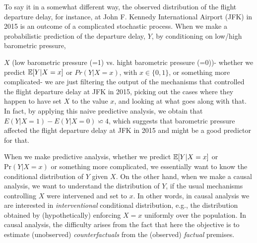 \begin{example}
{To say it in a somewhat different way, the observed distribution of
the flight departure delay, for instance,  at John F. Kennedy International Airport (JFK) in 2015 is an outcome of a complicated stochastic process. When we make
a probabilistic prediction of the departure delay, $Y$,  by
conditioning on low/high barometric pressure, $X$ (low barometric pressure (=1) vs. hight barometric pressure (=0))- whether we predict $\mathbb{E}[Y | X = x]$ or
$Pr(Y | X = x)$, with $x \in \{0,1\}$, or something more
complicated- we are just filtering the output of
the mechanisms that controlled the flight departure
 delay at JFK in 2015, picking out the cases where they
  happen to have set $X$ to the value $x$, and looking
  at what goes along with that. In fact, by applying this
   naive predictive analysis, we obtain that
   $E(Y | X = 1)-E(Y | X = 0)\backsimeq 4$, which suggests that
    barometric pressure affected the flight departure delay at
    JFK in 2015 and might be a good predictor for that.}
\end{example}





When we make predictive analysis, whether we predict $\mathbb{E}[Y | X = x]$ or $\textrm{Pr}(Y | X = x)$ or
something more complicated, we essentially want to know the conditional distribution of
$Y$ given $X$. On the other hand, when we make a causal
analysis, we want to understand the distribution of $Y$, if the
usual mechanisms controlling $X$ were intervened and set to $x$.
In other words, in causal analysis we are interested in {\em  interventional} conditional
distribution, e.g.,  the distribution  obtained by (hypothetically)
enforcing $X = x$ uniformly over the population.  In causal analysis, the difficulty arises   from the fact that here the objective is to estimate (unobserved)
   {\em counterfactuals} from the (observed) {\em factual} premises.



